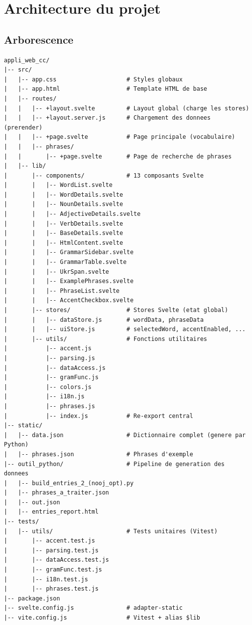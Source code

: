 \section{Architecture du projet}

\subsection{Arborescence}

\begin{lstlisting}[title=Structure des fichiers]
appli_web_cc/
|-- src/
|   |-- app.css                    # Styles globaux
|   |-- app.html                   # Template HTML de base
|   |-- routes/
|   |   |-- +layout.svelte         # Layout global (charge les stores)
|   |   |-- +layout.server.js      # Chargement des donnees (prerender)
|   |   |-- +page.svelte           # Page principale (vocabulaire)
|   |   |-- phrases/
|   |       |-- +page.svelte       # Page de recherche de phrases
|   |-- lib/
|       |-- components/            # 13 composants Svelte
|       |   |-- WordList.svelte
|       |   |-- WordDetails.svelte
|       |   |-- NounDetails.svelte
|       |   |-- AdjectiveDetails.svelte
|       |   |-- VerbDetails.svelte
|       |   |-- BaseDetails.svelte
|       |   |-- HtmlContent.svelte
|       |   |-- GrammarSidebar.svelte
|       |   |-- GrammarTable.svelte
|       |   |-- UkrSpan.svelte
|       |   |-- ExamplePhrases.svelte
|       |   |-- PhraseList.svelte
|       |   |-- AccentCheckbox.svelte
|       |-- stores/                # Stores Svelte (etat global)
|       |   |-- dataStore.js       # wordData, phraseData
|       |   |-- uiStore.js         # selectedWord, accentEnabled, ...
|       |-- utils/                 # Fonctions utilitaires
|           |-- accent.js
|           |-- parsing.js
|           |-- dataAccess.js
|           |-- gramFunc.js
|           |-- colors.js
|           |-- i18n.js
|           |-- phrases.js
|           |-- index.js           # Re-export central
|-- static/
|   |-- data.json                  # Dictionnaire complet (genere par Python)
|   |-- phrases.json               # Phrases d'exemple
|-- outil_python/                  # Pipeline de generation des donnees
|   |-- build_entries_2_(nooj_opt).py
|   |-- phrases_a_traiter.json
|   |-- out.json
|   |-- entries_report.html
|-- tests/
|   |-- utils/                     # Tests unitaires (Vitest)
|       |-- accent.test.js
|       |-- parsing.test.js
|       |-- dataAccess.test.js
|       |-- gramFunc.test.js
|       |-- i18n.test.js
|       |-- phrases.test.js
|-- package.json
|-- svelte.config.js               # adapter-static
|-- vite.config.js                 # Vitest + alias $lib
\end{lstlisting}

